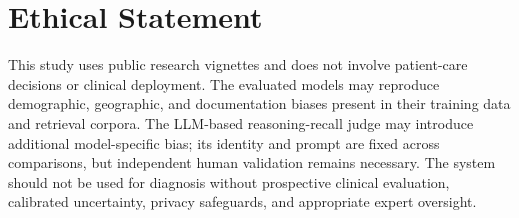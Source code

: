\documentclass[letterpaper]{article} %
\begin{document}
\section*{Ethical Statement}

This study uses public research vignettes and does not involve patient-care decisions or clinical deployment.
The evaluated models may reproduce demographic, geographic, and documentation biases present in their training data and retrieval corpora.
The LLM-based reasoning-recall judge may introduce additional model-specific bias; its identity and prompt are fixed across comparisons, but independent human validation remains necessary.
The system should not be used for diagnosis without prospective clinical evaluation, calibrated uncertainty, privacy safeguards, and appropriate expert oversight.
 

\end{document}
